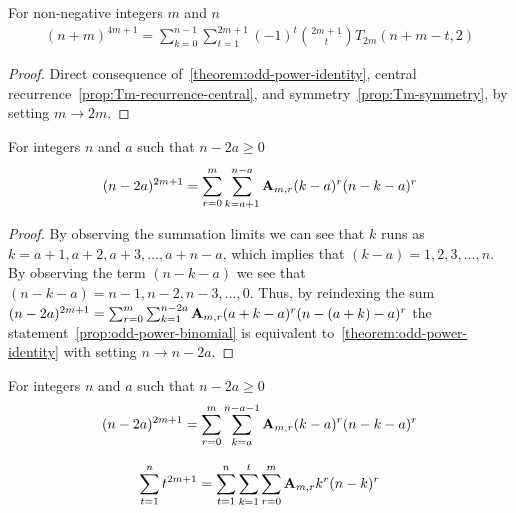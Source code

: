\begin{proposition}
    For non-negative integers $m$ and $n$
    \label{prop:odd-power-decomposition-central-shifted}
    \begin{align*}
    (n+m)
        ^{4m+1} = \sum_{k=0}^{n-1} \sum_{t=1}^{2m+1} (-1)^{t} \binom{2m+1}{t} T_{2m} (n+m-t, 2)
    \end{align*}
    \begin{proof}
        Direct consequence of~\eqref{theorem:odd-power-identity},
        central recurrence~\eqref{prop:Tm-recurrence-central}, and symmetry~\eqref{prop:Tm-symmetry},
        by setting $m \rightarrow 2m$.
    \end{proof}
\end{proposition}

\begin{proposition}
    \label{prop:odd-power-binomial}
    For integers $n$ and $a$ such that $n-2a \geq 0$
    \begin{align*}
    (n-2a)
        ^{2m+1} = \sum_{r=0}^{m} \sum_{k=a+1}^{n-a} {\mathbf{A}} \sb{m,r} (k-a)^r (n-k-a)^r
    \end{align*}
    \begin{proof}
        By observing the summation limits we can see that $k$ runs as $k=a+1,a+2,a+3,\ldots,a+n-a$, which
        implies that $(k-a)=1,2,3,\ldots, n$.
        By observing the term $(n-k-a)$ we see that $(n-k-a)=n-1,n-2,n-3,\ldots,0$.
        Thus, by reindexing the sum
        $(n-2a)^{2m+1} = \sum_{r=0}^{m} \sum_{k=1}^{n-2a} {\mathbf{A}} \sb{m,r} (a+k-a)^r (n-(a+k)-a)^r$
        the statement~\eqref{prop:odd-power-binomial} is equivalent to~\eqref{theorem:odd-power-identity}
        with setting $n \rightarrow n-2a$.
    \end{proof}
\end{proposition}

\begin{corollary}
    \label{prop:odd-power-binomial-shifted}
    For integers $n$ and $a$ such that $n-2a \geq 0$
    \begin{align*}
    (n-2a)
        ^{2m+1} = \sum_{r=0}^{m} \sum_{k=a}^{n-a-1} {\mathbf{A}} \sb{m,r} (k-a)^r (n-k-a)^r
    \end{align*}
\end{corollary}

\begin{proposition}
    \label{prop:sum-of-odd-powers}
    \begin{align*}
        \sum_{t=1}^{n} t^{2m+1} = \sum_{t=1}^{n} \sum_{k=1}^{t} \sum_{r=0}^{m} {\mathbf{A}} \sb{m,r} k^r (n-k)^r
    \end{align*}
\end{proposition}

